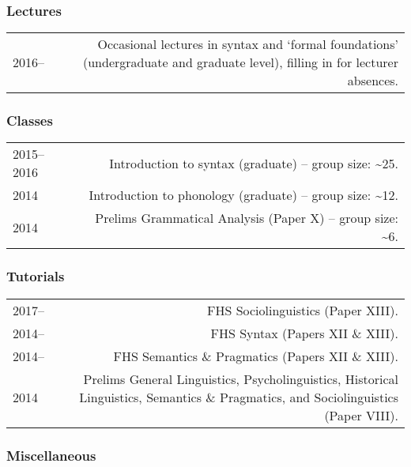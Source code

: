 \documentclass[11pt,a4paper,twoside]{article}
\makeatletter
\newenvironment{cvsection}{%
  \setlength{\extrarowheight}{0.70ex}
  \begin{longtable}[l]{@{} L R @{}}
}{%
  \end{longtable}
}
\makeatother
\begin{document}
\subsubsection*{Lectures}
\begin{cvsection}
2016--  & Occasional lectures in syntax and `formal foundations' (undergraduate and graduate level), filling in for lecturer absences.
\end{cvsection}

\subsubsection*{Classes}

\begin{cvsection}
2015--2016	&	Introduction to syntax (graduate) -- group size: \textasciitilde{}25.\\
2014			  &	Introduction to phonology (graduate) -- group size: \textasciitilde{}12.\\
2014			  &	Prelims Grammatical Analysis (Paper X) -- group size: \textasciitilde{}6.
\end{cvsection}

\subsubsection*{Tutorials}

\begin{cvsection}
2017--			&	FHS Sociolinguistics (Paper XIII).\\
2014--			&	FHS Syntax (Papers XII \& XIII).\\
2014--			&	FHS Semantics \& Pragmatics (Papers XII \& XIII).\\
2014				&	Prelims General Linguistics, Psycholinguistics, Historical Linguistics, Semantics \& 					Pragmatics, and Sociolinguistics (Paper VIII).\\
\end{cvsection}

\subsubsection*{Miscellaneous}
\end{document}
